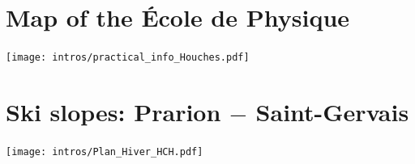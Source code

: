 \chapter{Map of the \'Ecole de Physique}

\texttt{[image: intros/practical\_info\_Houches.pdf]}
  


\chapter{Ski slopes: Prarion $-$ Saint-Gervais}

\texttt{[image: intros/Plan\_Hiver\_HCH.pdf]}
 

\newpage